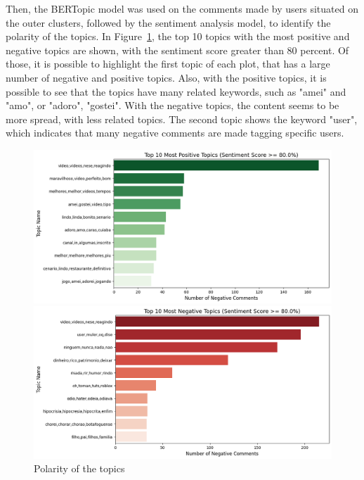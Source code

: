 \documentclass[12pt]{article}
\begin{document}
Then, the BERTopic model was used on the comments made by users situated on the outer clusters, 
followed by the sentiment analysis model, to identify the polarity of the topics.
In Figure~\ref{fig:ytbr1_topics}, the top 10 topics with the most positive and negative topics are 
shown, with the sentiment score greater than 80 percent. 
Of those, it is possible to highlight the first topic of each plot, that has a large number of negative
and positive topics. Also, with the positive topics, it is possible to see that the topics have many
related keywords, such as "amei" and "amo", or "adoro", "gostei".
With the negative topics, the content seems to be more spread, with less related topics. 
The second topic shows the keyword "user", which indicates that many negative comments are made tagging
specific users.

\begin{figure}[ht]
    \centering
    \begin{minipage}{0.44\textwidth}
        \centering
        \includegraphics[keepaspectratio,width=\textwidth]{./imgs/felipeneto/most_positive_topics.png}
    \end{minipage}%
    \hspace{0.05\textwidth} %
    \begin{minipage}{0.44\textwidth}
        \centering
        \includegraphics[keepaspectratio,width=\textwidth]{./imgs/felipeneto/most_negative_topics.png}
    \end{minipage}
    \caption{Polarity of the topics}
    \label{fig:ytbr1_topics}
\end{figure}




\end{document}
